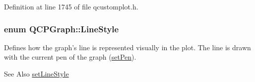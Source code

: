 Definition at line 1745 of file qcustomplot.\-h.

\hypertarget{class_q_c_p_graph_ad60175cd9b5cac937c5ee685c32c0859}{
\subsubsection[{Line\-Style}]{\setlength{\rightskip}{0pt plus 5cm}enum {\bf Q\-C\-P\-Graph\-::\-Line\-Style}}}\label{class_q_c_p_graph_ad60175cd9b5cac937c5ee685c32c0859}
Defines how the graph's line is represented visually in the plot. The line is drawn with the current pen of the graph (\hyperlink{class_q_c_p_abstract_plottable_ab74b09ae4c0e7e13142fe4b5bf46cac7}{set\-Pen}). \begin{DoxySeeAlso}{See Also}
\hyperlink{class_q_c_p_graph_a513fecccff5b2a50ce53f665338c60ff}{set\-Line\-Style} 
\end{DoxySeeAlso}
